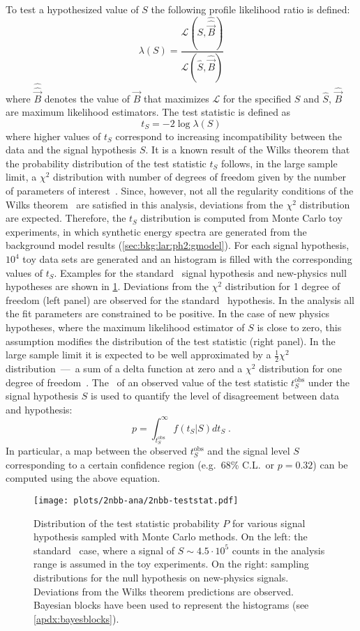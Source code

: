 To test a hypothesized value of $S$ the following profile likelihood ratio is defined:
\[
  \lambda(S) = \frac{\mathcal{L}(S, \hat{\hat{\vec{B}}})}{\mathcal{L}(\hat{S}, \hat{\vec{B}})}
\]
where $\hat{\hat{\vec{B}}}$ denotes the value of $\vec{B}$ that maximizes $\mathcal{L}$
for the specified $S$ and $\hat{S}$, $\hat{\vec{B}}$ are maximum likelihood
estimators. The test statistic is defined as
\[
  t_S = -2\log\lambda(S)
\]
where higher values of $t_S$ correspond to increasing incompatibility between the data and
the signal hypothesis $S$. It is a known result of the Wilks theorem that the probability
distribution of the test statistic $t_S$ follows, in the large sample limit, a $\chi^2$
distribution with number of degrees of freedom given by the number of parameters of
interest~\cite{Cowan2011}.  Since, however, not all the regularity conditions of the
Wilks theorem~\cite{Algeri2020} are satisfied in this analysis, deviations from
the $\chi^2$ distribution are expected. Therefore, the $t_S$ distribution is computed from
Monte Carlo toy experiments, in which synthetic energy spectra are generated from the
background model results (\cref{sec:bkg:lar:ph2:gmodel}). For each signal hypothesis,
$10^4$ toy data sets are generated and an histogram is filled with the corresponding
values of $t_S$. Examples for the standard \nnbb\ signal hypothesis and new-physics null
hypotheses are shown in \cref{fig:2nbb-ana:ts-dist}. Deviations from the $\chi^2$
distribution for 1 degree of freedom (left panel) are observed for the standard \nnbb\
hypothesis. In the analysis all the fit parameters are constrained to be positive. In the
case of new physics hypotheses, where the maximum likelihood estimator of $S$ is close to
zero, this assumption modifies the distribution of the test statistic (right panel). In
the large sample limit it is expected to be well approximated by a $\frac{1}{2}\chi^2$
distribution~---~a sum of a delta function at zero and a $\chi^2$ distribution for one
degree of freedom~\cite{Chernoff1954}.
\newpar
The \pvalue\ of an observed value of the test statistic $t_S^\text{obs}$ under the signal
hypothesis $S$ is used to quantify the level of disagreement between data and hypothesis:
\[
  p = \int_{t_S^\text{obs}}^\infty f(t_S | S) dt_S \;.
\]
In particular, a map between the observed $t_S^\text{obs}$ and the signal level $S$
corresponding to a certain confidence region (e.g.~68\% C.L.~or $p=0.32$) can be computed
using the above equation.

\begin{figure}
  \centering
  \texttt{[image: plots/2nbb-ana/2nbb-teststat.pdf]}
  \caption{%
    Distribution of the test statistic probability $P$ for various signal hypothesis
    sampled with Monte Carlo methods. On the left: the standard \nnbb\ case, where a
    signal of $S \sim 4.5 \cdot 10^5$ counts in the analysis range is assumed in the toy
    experiments. On the right: sampling distributions for the null hypothesis on
    new-physics signals.  Deviations from the Wilks theorem predictions are observed.
    Bayesian blocks have been used to represent the histograms (see
    \cref{apdx:bayesblocks}).
  }\label{fig:2nbb-ana:ts-dist}
\end{figure}

